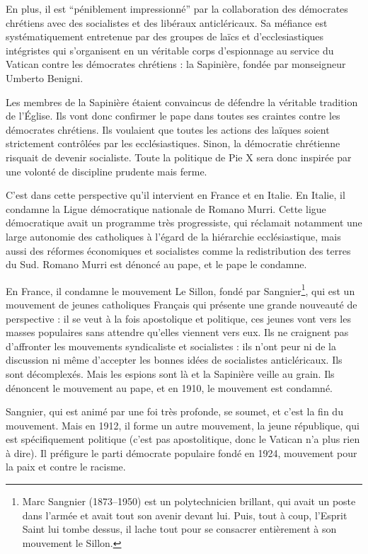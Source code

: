 \documentclass[12pt]{report}
\begin{document}
En plus, il est \enquote{péniblement impressionné} par la collaboration des démocrates chrétiens avec des socialistes et des libéraux anticléricaux.
Sa méfiance est systématiquement entretenue par des groupes de laïcs et d'ecclesiastiques intégristes qui s'organisent en un véritable corps d'espionnage au service du Vatican contre les démocrates chrétiens : la Sapinière, fondée par monseigneur Umberto Benigni.

Les membres de la Sapinière étaient convaincus de défendre la véritable tradition de l'Église. Ils vont donc confirmer le pape dans toutes ses craintes contre les démocrates chrétiens.
Ils voulaient que toutes les actions des laïques soient strictement contrôlées par les ecclésiastiques.
Sinon, la démocratie chrétienne risquait de devenir socialiste.
Toute la politique de Pie X sera donc inspirée par une volonté de discipline prudente mais ferme.

C'est dans cette perspective qu'il intervient en France et en Italie. En Italie, il condamne la Ligue démocratique nationale de Romano Murri. Cette ligue démocratique avait un programme très progressiste, qui réclamait notamment une large autonomie des catholiques à l'égard de la hiérarchie ecclésiastique, mais aussi des réformes économiques et socialistes comme la redistribution des terres du Sud.
Romano Murri est dénoncé au pape, et le pape le condamne.

En France, il condamne le mouvement Le Sillon, fondé par Sangnier\footnote{Marc Sangnier (1873--1950) est un polytechnicien brillant, qui avait un poste dans l'armée et avait tout son avenir devant lui. Puis, tout à coup, l'Esprit Saint lui tombe dessus, il lache tout pour se consacrer entièrement à son mouvement le Sillon.}, qui est un mouvement de jeunes catholiques Français qui présente une grande nouveauté de perspective : il se veut à la fois apostolique et politique, ces jeunes vont vers les masses populaires sans attendre qu'elles viennent vers eux. 
Ils ne craignent pas d’affronter les
mouvements syndicaliste et socialistes : ils n’ont peur ni de la discussion ni même
d’accepter les bonnes idées de socialistes anticléricaux. Ils sont décomplexés.
Mais les espions sont là et la Sapinière veille au grain. Ils dénoncent le mouvement au pape, et en 1910, le mouvement est condamné.

Sangnier, qui est animé par une foi très profonde, se soumet, et c'est la fin du mouvement.
Mais en 1912, il forme un autre mouvement, la jeune république, qui est spécifiquement politique (c'est pas apostolitique, donc le Vatican n'a plus rien à dire). Il préfigure le parti démocrate populaire fondé en 1924, mouvement pour la paix et contre le racisme.
\end{document}
